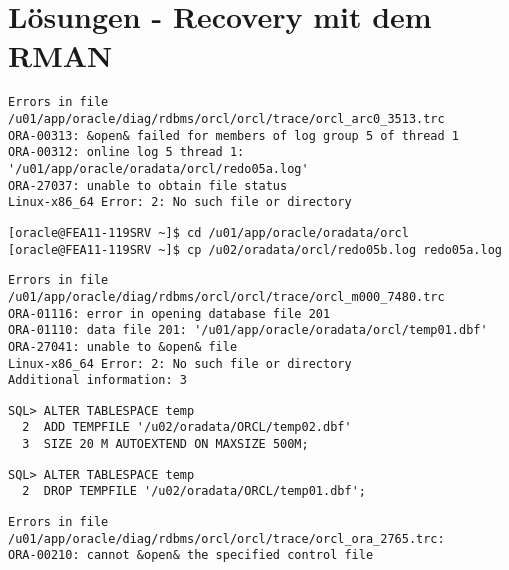\section{L\"osungen - Recovery mit dem RMAN}
  \begin{enumerate}
    
      \begin{lstlisting}[caption={Ermitteln des betroffenen Redo Log Members im Alert Log},language=terminal]
Errors in file /u01/app/oracle/diag/rdbms/orcl/orcl/trace/orcl_arc0_3513.trc
ORA-00313: &open& failed for members of log group 5 of thread 1
ORA-00312: online log 5 thread 1: '/u01/app/oracle/oradata/orcl/redo05a.log'
ORA-27037: unable to obtain file status
Linux-x86_64 Error: 2: No such file or directory
      \end{lstlisting}
      \begin{lstlisting}[caption={Recovern des Members},language=terminal]
[oracle@FEA11-119SRV ~]$ cd /u01/app/oracle/oradata/orcl
[oracle@FEA11-119SRV ~]$ cp /u02/oradata/orcl/redo05b.log redo05a.log
      \end{lstlisting}
    
    
    
      \begin{lstlisting}[caption={Ermitteln des betroffenen Tempfiles im Alert Log},language=terminal]
Errors in file /u01/app/oracle/diag/rdbms/orcl/orcl/trace/orcl_m000_7480.trc
ORA-01116: error in opening database file 201
ORA-01110: data file 201: '/u01/app/oracle/oradata/orcl/temp01.dbf'
ORA-27041: unable to &open& file
Linux-x86_64 Error: 2: No such file or directory
Additional information: 3
      \end{lstlisting}
      \begin{lstlisting}[caption={Neues Tempfile erstellen},language=oracle_sql]
SQL> ALTER TABLESPACE temp
  2  ADD TEMPFILE '/u02/oradata/ORCL/temp02.dbf'
  3  SIZE 20 M AUTOEXTEND ON MAXSIZE 500M;
      \end{lstlisting}
\clearpage
      \begin{lstlisting}[caption={Besch\"adigtes Tempfile l\"oschen},language=oracle_sql]
SQL> ALTER TABLESPACE temp
  2  DROP TEMPFILE '/u02/oradata/ORCL/temp01.dbf';
      \end{lstlisting}
    
      \begin{lstlisting}[caption={Ermitteln der betroffenen Kontrolldatei im Alert Log},language=terminal]
Errors in file /u01/app/oracle/diag/rdbms/orcl/orcl/trace/orcl_ora_2765.trc:
ORA-00210: cannot &open& the specified control file

\end{lstlisting}
\end{enumerate}
